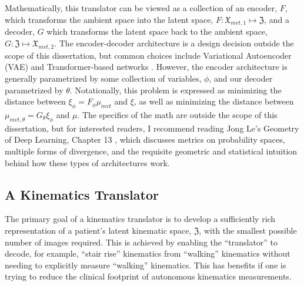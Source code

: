Mathematically, this translator can be viewed as a collection of an encoder, $F$, which transforms the ambient space into the latent space, $F: \mathfrak{X}_{mvt,1} \mapsto \mathfrak{Z}$, and a decoder, $G$ which transforms the latent space back to the ambient space, $G: \mathfrak{Z} \mapsto \mathfrak{X}_{mvt,2}$. The encoder-decoder architecture is a design decision outside the scope of this dissertation, but common choices include Variational Autoencoder (VAE) and Transformer-based networks \cite{vaswaniAttentionAllYou2017}.
However, the encoder architecture is generally parametrized by some collection of variables, $\phi$, and our decoder parametrized by $\theta$.
Notationally, this problem is expressed as minimizing the distance between $\xi_{\phi} = F_{\phi}\mu_{mvt}$ and $\xi$, as well as minimizing the distance between $\mu_{mvt,\theta} = G_{\theta}\xi_{\phi}$ and $\mu$.
The specifics of the math are outside the scope of this dissertation, but for interested readers, I recommend reading Jong Le's Geometry of Deep Learning, Chapter 13 \cite{yeGeometryDeepLearning2022}, which discusses metrics on probability spaces, multiple forms of divergence, and the requisite geometric and statistical intuition behind how these types of architectures work.

\subsection{A Kinematics Translator}
The primary goal of a kinematics translator is to develop a sufficiently rich representation of a patient's latent kinematic space, $\mathfrak{Z}$, with the smallest possible number of images required.
This is achieved by enabling the ``translator'' to decode, for example, ``stair rise'' kinematics from ``walking'' kinematics without needing to explicitly measure ``walking'' kinematics.
This has benefits if one is trying to reduce the clinical footprint of autonomous kinematics measurements.

